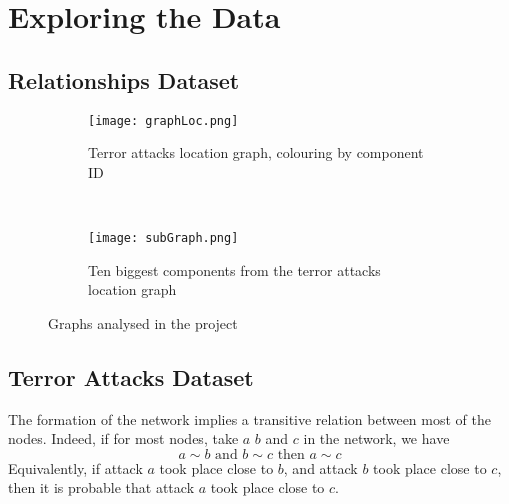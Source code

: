 \section{Exploring the Data}
\label{sec:Exploring the Data}

\subsection{Relationships Dataset}
\label{subsec:Relationships Dataset}

\begin{figure}[H]
\begin{center}
    \begin{subfigure}[b]{0.45\textwidth}
        \texttt{[image: graphLoc.png]}
        \caption{Terror attacks location graph, colouring by component ID}
        \label{fig:graphLoc}
    \end{subfigure}
    ~
    \begin{subfigure}[b]{0.45\textwidth}
        \texttt{[image: subGraph.png]}
        \caption{Ten biggest components from the terror attacks location graph}
        \label{fig:subGraph}
    \end{subfigure}
\caption{Graphs analysed in the project}
\label{fig:graphPlots}
\end{center}
\end{figure}

\subsection{Terror Attacks Dataset}
\label{subsec:Terror Attacks Dataset}

The formation of the network implies a transitive relation between most of the nodes. Indeed, if for most nodes, take $a$ $b$ and $c$ in the network, we have
\begin{equation}
a \sim b \text{ and } b \sim c \text{ then } a \sim c 
\end{equation}
Equivalently, if attack $a$ took place close to $b$, and attack $b$ took place close to $c$, then it is probable that attack $a$ took place close to $c$.